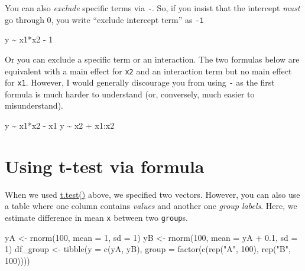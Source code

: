 \documentclass[
]{book}
\newenvironment{Shaded}{\begin{snugshade}}{\end{snugshade}}
\newcommand{\AttributeTok}[1]{\textcolor[rgb]{0.77,0.63,0.00}{#1}}
\newcommand{\DecValTok}[1]{\textcolor[rgb]{0.00,0.00,0.81}{#1}}
\newcommand{\FloatTok}[1]{\textcolor[rgb]{0.00,0.00,0.81}{#1}}
\newcommand{\FunctionTok}[1]{\textcolor[rgb]{0.00,0.00,0.00}{#1}}
\newcommand{\NormalTok}[1]{#1}
\newcommand{\OtherTok}[1]{\textcolor[rgb]{0.56,0.35,0.01}{#1}}
\newcommand{\SpecialCharTok}[1]{\textcolor[rgb]{0.00,0.00,0.00}{#1}}
\newcommand{\StringTok}[1]{\textcolor[rgb]{0.31,0.60,0.02}{#1}}
\begin{document}
You can also \emph{exclude} specific terms via \texttt{-}. So, if you insist that the intercept \emph{must} go through 0, you write ``exclude intercept term'' as \texttt{-1}

\begin{Shaded}
\begin{Highlighting}[]
\NormalTok{y }\SpecialCharTok{\textasciitilde{}}\NormalTok{ x1}\SpecialCharTok{*}\NormalTok{x2 }\SpecialCharTok{{-}} \DecValTok{1}
\end{Highlighting}
\end{Shaded}

Or you can exclude a specific term or an interaction. The two formulas below are equivalent with a main effect for \texttt{x2} and an interaction term but no main effect for \texttt{x1}. However, I would generally discourage you from using \texttt{-} as the first formula is much harder to understand (or, conversely, much easier to misunderstand).

\begin{Shaded}
\begin{Highlighting}[]
\NormalTok{y }\SpecialCharTok{\textasciitilde{}}\NormalTok{ x1}\SpecialCharTok{*}\NormalTok{x2 }\SpecialCharTok{{-}}\NormalTok{ x1}
\NormalTok{y }\SpecialCharTok{\textasciitilde{}}\NormalTok{ x2 }\SpecialCharTok{+}\NormalTok{ x1}\SpecialCharTok{:}\NormalTok{x2}
\end{Highlighting}
\end{Shaded}

\hypertarget{using-t-test-via-formula}{%
\section{Using t-test via formula}\label{using-t-test-via-formula}}

When we used \href{https://stat.ethz.ch/R-manual/R-devel/library/stats/html/t.test.html}{t.test()} above, we specified two vectors. However, you can also use a table where one column contains \emph{values} and another one \emph{group labels}. Here, we estimate difference in mean \texttt{x} between two \texttt{group}s.

\begin{Shaded}
\begin{Highlighting}[]
\NormalTok{yA }\OtherTok{\textless{}{-}} \FunctionTok{rnorm}\NormalTok{(}\DecValTok{100}\NormalTok{, }\AttributeTok{mean =} \DecValTok{1}\NormalTok{, }\AttributeTok{sd =} \DecValTok{1}\NormalTok{)}
\NormalTok{yB }\OtherTok{\textless{}{-}} \FunctionTok{rnorm}\NormalTok{(}\DecValTok{100}\NormalTok{, }\AttributeTok{mean =}\NormalTok{ yA }\SpecialCharTok{+} \FloatTok{0.1}\NormalTok{, }\AttributeTok{sd =} \DecValTok{1}\NormalTok{)}
\NormalTok{df\_group }\OtherTok{\textless{}{-}}
  \FunctionTok{tibble}\NormalTok{(}\AttributeTok{y =} \FunctionTok{c}\NormalTok{(yA, yB),}
         \AttributeTok{group =} \FunctionTok{factor}\NormalTok{(}\FunctionTok{c}\NormalTok{(}\FunctionTok{rep}\NormalTok{(}\StringTok{"A"}\NormalTok{, }\DecValTok{100}\NormalTok{), }\FunctionTok{rep}\NormalTok{(}\StringTok{"B"}\NormalTok{, }\DecValTok{100}\NormalTok{))))}
\end{Highlighting}
\end{Shaded}
\end{document}
